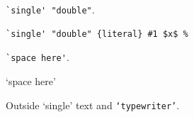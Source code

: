 \documentclass{article}
\begin{document}
\verb|`single' "double"|.
\begin{verbatim}
`single' "double" {literal} #1 $x$ %
\end{verbatim}
\verb*|`space here'|.
\begin{verbatim*}
`space here'
\end{verbatim*}
Outside `single' text and \texttt{`typewriter'}.
\end{document}
